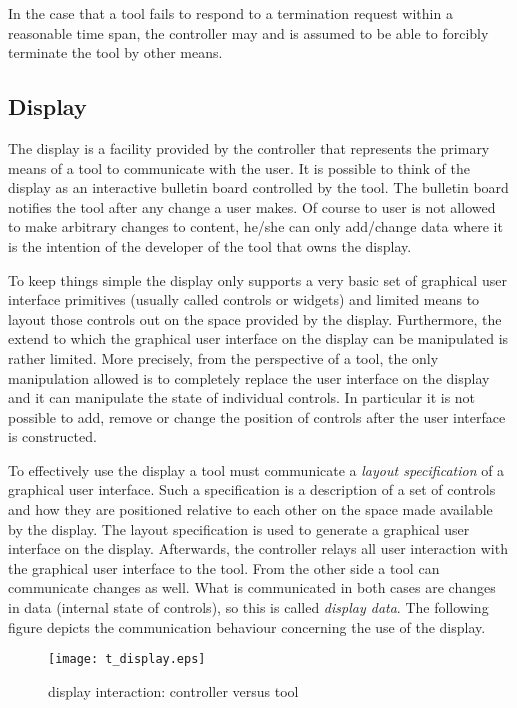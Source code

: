 \documentclass{article}
\begin{document}
   \noindent In the case that a tool fails to respond to a termination request
   within a reasonable time span, the controller may and is assumed to be able
   to forcibly terminate the tool by other means.
  \subsection{Display} \label{ss:user_interaction}

   The display is a facility provided by the controller that represents the
   primary means of a tool to communicate with the user. It is possible to
   think of the display as an interactive bulletin board controlled by the
   tool. The bulletin board notifies the tool after any change a user makes. Of
   course to user is not allowed to make arbitrary changes to content, he/she
   can only add/change data where it is the intention of the developer of the
   tool that owns the display.

   To keep things simple the display only supports a very basic set of
   graphical user interface primitives (usually called controls or widgets) and
   limited means to layout those controls out on the space provided by the
   display.  Furthermore, the extend to which the graphical user interface on
   the display can be manipulated is rather limited. More precisely, from the
   perspective of a tool, the only manipulation allowed is to completely
   replace the user interface on the display and it can manipulate the state of
   individual controls. In particular it is not possible to add, remove or
   change the position of controls after the user interface is constructed.

   To effectively use the display a tool must communicate a \textit{layout
   specification} of a graphical user interface. Such a specification is a
   description of a set of controls and how they are positioned relative to
   each other on the space made available by the display. The layout
   specification is used to generate a graphical user interface on the display.
   Afterwards, the controller relays all user interaction with the graphical
   user interface to the tool. From the other side a tool can communicate
   changes as well. What is communicated in both cases are changes in data
   (internal state of controls), so this is called \textit{display data}. The
   following figure depicts the communication behaviour concerning the use of
   the display.
   
   \begin{figure}[H]
    \begin{center}
     \texttt{[image: t\_display.eps]}
    \end{center}
    \vspace{-0.4cm}
    \caption{display interaction: controller versus tool}
   \end{figure}
\end{document}
